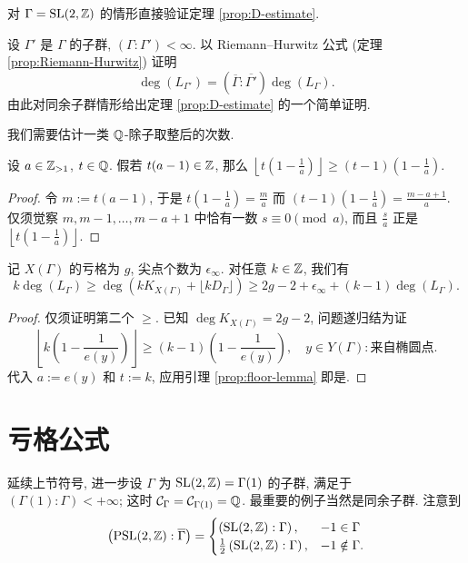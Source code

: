 \begin{exercise}
	对 $\Gamma = \operatorname{SL}(2,\mathbb{Z})$ 的情形直接验证定理 \ref{prop:D-estimate}.
\end{exercise}

\begin{exercise}
	设 $\Gamma'$ 是 $\Gamma$ 的子群, $(\Gamma:\Gamma') < \infty$. 以 Riemann--Hurwitz 公式 (定理 \ref{prop:Riemann-Hurwitz}) 证明
	\[ \deg(L_{\Gamma'}) = (\overline{\Gamma} : \overline{\Gamma'}) \deg(L_\Gamma). \]
	由此对同余子群情形给出定理 \ref{prop:D-estimate} 的一个简单证明.
\end{exercise}

我们需要估计一类 $\mathbb{Q}$-除子取整后的次数.
\begin{lemma}\label{prop:floor-lemma}
	设 $a \in \mathbb{Z}_{>1}$, $t \in \mathbb{Q}$. 假若 $t(a-1) \in \mathbb{Z}$, 那么 $\left\lfloor t(1 - \frac{1}{a}) \right\rfloor \geq (t-1) (1 - \frac{1}{a})$.
\end{lemma}
\begin{proof}
	令 $m := t(a-1)$, 于是 $t\left(1 - \frac{1}{a} \right) = \frac{m}{a}$ 而 $(t-1)\left(1 - \frac{1}{a}\right) = \frac{m-a+1}{a}$. 仅须觉察 $m, m-1, \ldots, m-a+1$ 中恰有一数 $s \equiv 0 \pmod a$, 而且 $\frac{s}{a}$ 正是 $\left\lfloor t(1 - \frac{1}{a}) \right\rfloor$.
\end{proof}

\begin{proposition}\label{prop:floor-Hodge}
	记 $X(\Gamma)$ 的亏格为 $g$, 尖点个数为 $\epsilon_\infty$. 对任意 $k \in \mathbb{Z}$, 我们有
	\[ k \deg(L_\Gamma) \geq \deg\left( k K_{X(\Gamma)} + \lfloor k D_\Gamma \rfloor \right) \geq 2g - 2 + \epsilon_\infty + (k-1) \deg(L_\Gamma). \]
\end{proposition}
\begin{proof}
	仅须证明第二个 $\geq$. 已知 $\deg K_{X(\Gamma)} = 2g - 2$, 问题遂归结为证
	\[ \left\lfloor k \left( 1 - \frac{1}{e(y)} \right) \right\rfloor \geq (k-1) \left( 1 - \frac{1}{e(y)} \right), \quad y \in Y(\Gamma): \text{来自椭圆点}. \]
	代入 $a := e(y)$ 和 $t := k$, 应用引理 \ref{prop:floor-lemma} 即是.
\end{proof}

\section{亏格公式}\label{sec:genus-formula}
延续上节符号, 进一步设 $\Gamma$ 为 $\operatorname{SL}(2,\mathbb{Z}) = \Gamma(1)$ 的子群, 满足于 $(\Gamma(1):\Gamma) < +\infty$; 这时 $\mathcal{C}_\Gamma = \mathcal{C}_{\Gamma(1)} = \mathbb{Q}$. 最重要的例子当然是同余子群. 注意到
\[ \left(\operatorname{PSL}(2, \mathbb{Z}) : \overline{\Gamma}\right) = \begin{cases}
	\left( \operatorname{SL}(2,\mathbb{Z}) : \Gamma \right), & -1 \in \Gamma \\
	\frac{1}{2} \left( \operatorname{SL}(2,\mathbb{Z}) : \Gamma \right), & -1 \notin \Gamma.
\end{cases}\]


